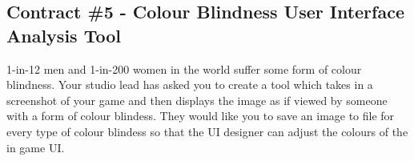 \documentclass{../../fal_assignment}
\begin{document}
\subsection*{Contract \#5 - Colour Blindness User Interface Analysis Tool}
1-in-12 men and 1-in-200 women in the world suffer some form of colour blindness. Your studio lead has asked you to create a tool which takes in a screenshot of your game and then displays the image as if viewed by someone with a form of colour blindess. They would like you to save an image to file for every type of colour blindess so that the UI designer can adjust the colours of the in game UI.
\end{document}
